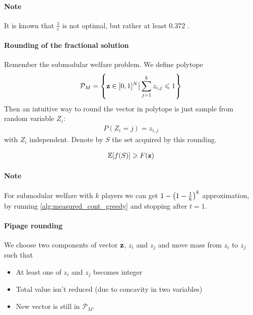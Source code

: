 \paragraph{Note} It is known that $\frac{1}{e}$ is not optimal, but rather at least $0.372$ \cite{ene2016constrained}.

\paragraph{Rounding of the fractional solution}
Remember the submodular welfare problem. We define polytope
\begin{align}
\mathcal{P}_M = \qty{ \vb{z} \in [0,1]^N \big\vert \sum_{j=1}^k z_{i,j} \leqslant 1}
\end{align}
Then an intuitive way to round the vector in polytope is just sample from random variable $Z_i$:
\begin{align}
P(Z_i= j) = z_{i,j}
\end{align}
with $Z_i$ independent. Denote by $S$ the set acquired by this rounding.
\begin{prop}
	\begin{align}
	\mathbb{E}\qty[f(S)] \geqslant F(\vb{z})
	\end{align}
\end{prop}

\paragraph{Note} For submodular welfare with $k$ players we can get $1-\qty(1-\frac{1}{k})^k$ approximation, by running \vref{alg:measured_cont_greedy} and stopping after $t=1$.


\paragraph{Pipage rounding \cite{ageev2004pipage}}
We choose two components of vector $\vb{z}$, $z_i$ and $z_j$ and move mass from $z_i$ to $z_j$ such that
\begin{itemize}
	\item At least one of  $z_i$ and $z_j$ becomes integer
	\item Total value isn't reduced (due to concavity in two variables)
	\item New vector is still in $\mathcal{P}_M$. 
\end{itemize}